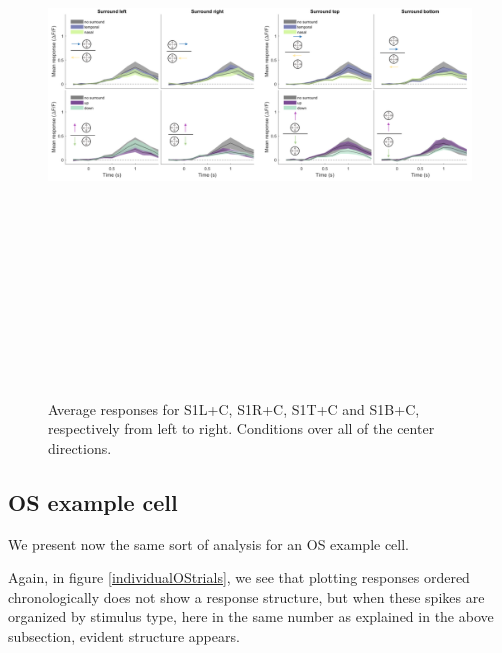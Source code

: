 \begin{figure}[H] \centering \includegraphics[width=15.9cm,height=15.9cm,keepaspectratio]{Figures/7.Results/individualSM/roi_29_mf379_pos5/4.png} 
\caption{Average responses for S1L+C, S1R+C, S1T+C and S1B+C, respectively from left to right. Conditions over all of the center directions.
\label{DSexamplecellaverage}}
\end{figure}

\subsection{OS example cell}

We present now the same sort of analysis for an OS example cell.

Again, in figure \ref{individualOStrials}, we see that plotting responses ordered chronologically does not show a response structure, but when these spikes are organized by stimulus type, here in the same number as explained in the above subsection, evident structure appears.

